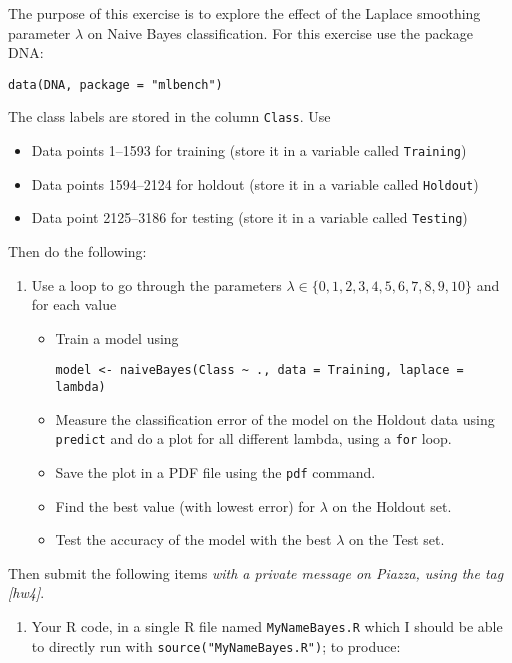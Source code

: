 \begin{exercise}
  The purpose of this exercise is to explore the effect of the Laplace smoothing parameter $\lambda$ on Naive Bayes classification. For this exercise use the package DNA:
\begin{lstlisting}
data(DNA, package = "mlbench")
\end{lstlisting}
  The class labels are stored in the column \texttt{Class}. Use
  \begin{itemize}
  \item Data points 1--1593 for training (store it in a variable called \texttt{Training})
  \item Data points 1594--2124 for holdout (store it in a variable called \texttt{Holdout})
  \item Data point 2125--3186 for testing  (store it in a variable called \texttt{Testing})
  \end{itemize}
  Then do the following:
  \begin{enumerate}
  \item Use a loop to go through the parameters $\lambda  \in \{0, 1, 2, 3, 4, 5, 6, 7, 8, 9, 10\}$ and for each value
    \begin{itemize}
    \item Train a model using 
\begin{lstlisting}
model <- naiveBayes(Class ~ ., data = Training, laplace = lambda)
\end{lstlisting}
    \item Measure the classification error of the model on the Holdout data using \texttt{predict} and do a plot for all different lambda, using a \texttt{for} loop.
    \item Save the plot in a PDF file using the \texttt{pdf} command.
    \item Find the best value (with lowest error) for $\lambda$ on the Holdout set.
    \item Test the accuracy of the model with the best $\lambda$ on the Test set.
    \end{itemize}
  \end{enumerate}
  Then submit the following items \emph{with a private message on Piazza, using the tag [hw4]}.
  \begin{enumerate}
  \item Your R code, in a single R file named \texttt{MyNameBayes.R} which I should be able to directly run with \texttt{source("MyNameBayes.R")}; to produce:
    \begin{enumerate}[(a)]

\end{enumerate}
\end{enumerate}
\end{exercise}
